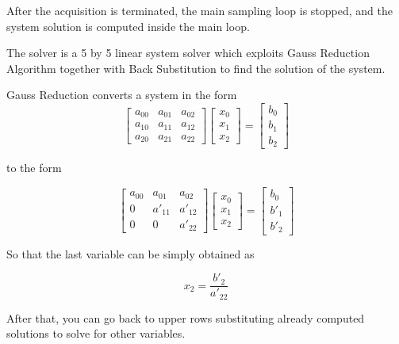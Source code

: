 \documentclass[main]{subfiles}
\begin{document}
After the acquisition is terminated, the main sampling loop is stopped, and the 
system solution is computed inside the main loop.

The solver is a 5 by 5 linear system solver which exploits Gauss Reduction 
Algorithm together with Back Substitution to find the solution of the system.

Gauss Reduction converts a system in the form
\begin{equation}
    \begin{bmatrix}
        a_{00} & a_{01} & a_{02}\\
        a_{10} & a_{11} & a_{12}\\
        a_{20} & a_{21} & a_{22}
    \end{bmatrix}
    \begin{bmatrix}
        x_0\\
        x_1\\
        x_2
    \end{bmatrix}=
    \begin{bmatrix}
        b_0\\
        b_1\\
        b_2
    \end{bmatrix}
\end{equation}

to the form 

\begin{equation}
    \begin{bmatrix}
        a_{00} & a_{01} & a_{02}\\
        0 & a'_{11} & a'_{12}\\
        0 & 0 & a'_{22}
    \end{bmatrix}
    \begin{bmatrix}
        x_0\\
        x_1\\
        x_2
    \end{bmatrix}=
    \begin{bmatrix}
        b_0\\
        b'_1\\
        b'_2
    \end{bmatrix}
\end{equation}

So that the last variable can be simply obtained as

\begin{equation}
    x_2 = \frac{b'_2}{a'_{22}}
\end{equation}

After that, you can go back to upper rows substituting already computed solutions 
to solve for other variables.
\end{document}
